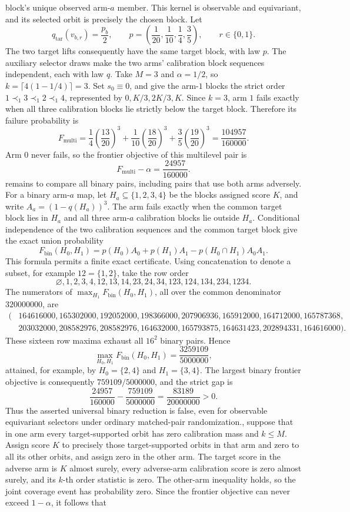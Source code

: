 block's unique observed arm-\(a\) member. This kernel is observable and equivariant, and its selected orbit is precisely the chosen block. Let\[q_{\mathrm{tar}}(v_{b,r})=\frac{p_b}{2},\qquad p=\left(\frac1{20},\frac1{10},\frac14,\frac35\right),\qquad r\in\{0,1\}.\]The two target lifts consequently have the same target block, with law \(p\). The auxiliary selector draws make the two arms' calibration block sequences independent, each with law \(q\). Take \(M=3\) and \(\alpha=1/2\), so \(k=\lceil4(1-1/4)\rceil=3\). Set \(s_0\equiv0\), and give the arm-\(1\) blocks the strict order \(1\prec_1 3\prec_1 2\prec_1 4\), represented by \(0,K/3,2K/3,K\). Since \(k=3\), arm \(1\) fails exactly when all three calibration blocks lie strictly below the target block. Therefore its failure probability is\[F_{\mathrm{multi}}=\frac14\left(\frac{13}{20}\right)^3+\frac1{10}\left(\frac{18}{20}\right)^3+\frac35\left(\frac{19}{20}\right)^3=\frac{104957}{160000}.\]Arm \(0\) never fails, so the frontier objective of this multilevel pair is\[F_{\mathrm{multi}}-\alpha=\frac{24957}{160000}.\]\n\nIt remains to compare all binary pairs, including pairs that use both arms adversely. For a binary arm-\(a\) map, let \(H_a\subseteq\{1,2,3,4\}\) be the blocks assigned score \(K\), and write \(A_a=(1-q(H_a))^3\). The arm fails exactly when the common target block lies in \(H_a\) and all three arm-\(a\) calibration blocks lie outside \(H_a\). Conditional independence of the two calibration sequences and the common target block give the exact union probability\[F_{\mathrm{bin}}(H_0,H_1)=p(H_0)A_0+p(H_1)A_1-p(H_0\cap H_1)A_0A_1.\]This formula permits a finite exact certificate. Using concatenation to denote a subset, for example \(12=\{1,2\}\), take the row order\[\varnothing,1,2,3,4,12,13,14,23,24,34,123,124,134,234,1234.\]The numerators of \(\max_{H_1}F_{\mathrm{bin}}(H_0,H_1)\), all over the common denominator \(320000000\), are\[\begin{split}(&164616000,165302000,192052000,198366000,207906936,165912000,164712000,165787368,\\&203032000,208582976,208582976,164632000,165793875,164631423,202894331,164616000).\end{split}\]These sixteen row maxima exhaust all \(16^2\) binary pairs. Hence\[\max_{H_0,H_1}F_{\mathrm{bin}}(H_0,H_1)=\frac{3259109}{5000000},\]attained, for example, by \(H_0=\{2,4\}\) and \(H_1=\{3,4\}\). The largest binary frontier objective is consequently \(759109/5000000\), and the strict gap is\[\frac{24957}{160000}-\frac{759109}{5000000}=\frac{83189}{20000000}>0.\]Thus the asserted universal binary reduction is false, even for observable equivariant selectors under ordinary matched-pair randomization.\n\nFinally, suppose that in one arm every target-supported orbit has zero calibration mass and \(k\le M\). Assign score \(K\) to precisely those target-supported orbits in that arm and zero to all its other orbits, and assign zero in the other arm. The target score in the adverse arm is \(K\) almost surely, every adverse-arm calibration score is zero almost surely, and its \(k\)-th order statistic is zero. The other-arm inequality holds, so the joint coverage event has probability zero. Since the frontier objective can never exceed \(1-\alpha\), it follows that 